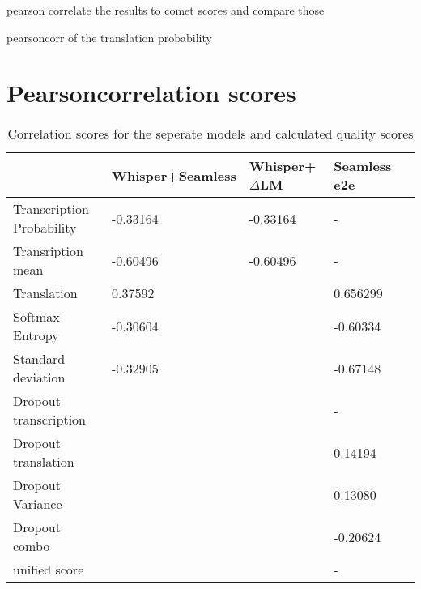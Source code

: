pearson correlate \cite{2020SciPy-NMeth} the results to comet scores and compare those 

pearsoncorr of the translation probability

\section{Pearsoncorrelation scores}
\begin{table}[ht]
\begin{tabular}{l|llll}
 &  Whisper+Seamless & Whisper+$\Delta$LM&  Seamless e2e\\ \hline
 Transcription Probability& -0.33164 & -0.33164&  -  \\
 Transription mean & -0.60496 & -0.60496  &   - \\ \hline
Translation& 0.37592 &    & 0.656299\\ 
Softmax Entropy& -0.30604   &  & -0.60334 \\
Standard deviation & -0.32905  &  & -0.67148 \\ \hline


Dropout transcription &  &  & -\\
Dropout translation & & & 0.14194\\

Dropout Variance & & & 0.13080\\
Dropout combo & & & -0.20624\\
\hline
unified score   &  &  & - %



\end{tabular}
\label{results}
\caption{Correlation scores for the seperate models and calculated quality scores}
\end{table}
